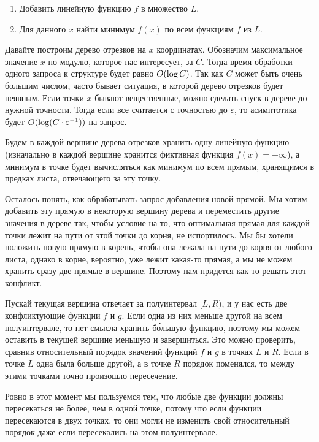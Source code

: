 \begin{enumerate}
    \item Добавить линейную функцию $f$ в множество $L$.
    \item Для данного $x$ найти минимум $f(x)$ по всем функциям $f$ из $L$.
\end{enumerate}

Давайте построим дерево отрезков на $x$ координатах. Обозначим максимальное значение $x$ по модулю, которое нас интересует, за $C$. Тогда время обработки одного запроса к структуре будет равно $O(\log C)$. Так как $C$ может быть очень большим числом, часто бывает ситуация, в которой дерево отрезков будет неявным. Если точки $x$ бывают вещественные, можно сделать спуск в дереве до нужной точности. Тогда если все считается с точностью до $\varepsilon$, то асимптотика будет $O(\log (C \cdot \varepsilon^{-1}))$ на запрос.

Будем в каждой вершине дерева отрезков хранить одну линейную функцию (изначально в каждой вершине хранится фиктивная функция $f(x) = +\infty$), а минимум в точке будет вычисляться как минимум по всем прямым, хранящимся в предках листа, отвечающего за эту точку.

Осталось понять, как обрабатывать запрос добавления новой прямой. Мы хотим добавить эту прямую в некоторую вершину дерева и переместить другие значения в дереве так, чтобы условие на то, что оптимальная прямая для каждой точки лежит на пути от этой точки до корня, не испортилось. Мы бы хотели положить новую прямую в корень, чтобы она лежала на пути до корня от любого листа, однако в корне, вероятно, уже лежит какая-то прямая, а мы не можем хранить сразу две прямые в вершине. Поэтому нам придется как-то решать этот конфликт.

Пускай текущая вершина отвечает за полуинтервал $[L, R)$, и у нас есть две конфликтующие функции $f$ и $g$. Если одна из них меньше другой на всем полуинтервале, то нет смысла хранить б\'{о}льшую функцию, поэтому мы можем оставить в текущей вершине меньшую и завершиться. Это можно проверить, сравнив относительный порядок значений функций $f$ и $g$ в точках $L$ и $R$. Если в точке $L$ одна была больше другой, а в точке $R$ порядок поменялся, то между этими точками точно произошло пересечение.

\begin{observation}
     Ровно в этот момент мы пользуемся тем, что любые две функции должны пересекаться не более, чем в одной точке, потому что если функции пересекаются в двух точках, то они могли не изменить свой относительный порядок даже если пересекались на этом полуинтервале.
\end{observation}

